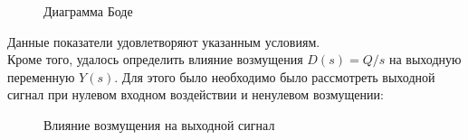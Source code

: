 \documentclass[12pt, a4paper]{report}
\theoremstyle{definition}
\theoremstyle{plain}
\theoremstyle{remark}
\theoremstyle{remark}
\theoremstyle{definition}
\begin{document}
 \begin{figure}[h!]
    \caption{Диаграмма Боде}
\end{figure}
 
 Данные показатели удовлетворяют указанным условиям.\\
 
 Кроме того, удалось определить влияние возмущения $D(s)=Q/s$  на выходную переменную $Y(s)$. Для этого было необходимо было рассмотреть выходной сигнал при нулевом входном воздействии и ненулевом возмущении:
  \begin{figure}[h!]
    \caption{Влияние возмущения на выходной сигнал}
\end{figure}
 
\end{document}
